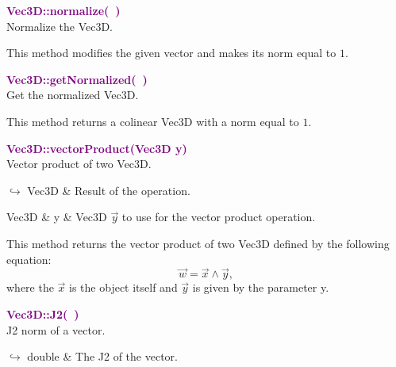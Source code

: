 \textcolor{purple}{\textbf{Vec3D::normalize(~)}}\label{Vec3D::normalize()}\\
Normalize the Vec3D.

This method modifies the given vector and makes its norm equal to $1$.

\textcolor{purple}{\textbf{Vec3D::getNormalized(~)}}\label{Vec3D::getNormalized()}\\
Get the normalized Vec3D.

This method returns a colinear Vec3D with a norm equal to $1$.

\textcolor{purple}{\textbf{Vec3D::vectorProduct(Vec3D y)}}\label{Vec3D::vectorProduct(Vec3D y)}\\
Vector product of two Vec3D.\vspace*{-0.5em}
\begin{tcolorbox}[grow to left by=-1cm, width=\textwidth-1cm,myArgs,tabularx={l|R}]
$\hookrightarrow$ Vec3D & Result of the operation.
\end{tcolorbox}

\begin{tcolorbox}[width=\textwidth,myArgs,tabularx={ll|R}]
Vec3D & y & Vec3D $\overrightarrow{y}$ to use for the vector product operation.
\end{tcolorbox}

This method returns the vector product of two Vec3D defined by the following equation:
\begin{equation*}
\overrightarrow{w} = \overrightarrow{x}\land\overrightarrow{y},
\end{equation*}
where the $\overrightarrow{x}$ is the object itself and $\overrightarrow{y}$ is given by the parameter y.

\textcolor{purple}{\textbf{Vec3D::J2(~)}}\label{Vec3D::J2()}\\
J2 norm of a vector.\vspace*{-0.5em}
\begin{tcolorbox}[grow to left by=-1cm, width=\textwidth-1cm,myArgs,tabularx={l|R}]
$\hookrightarrow$ double & The J2 of the vector.
\end{tcolorbox}


